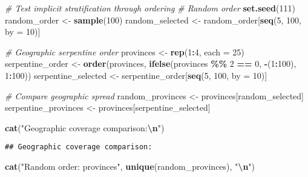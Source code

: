 \documentclass[
]{article}
\newenvironment{Shaded}{\begin{snugshade}}{\end{snugshade}}
\newcommand{\AttributeTok}[1]{\textcolor[rgb]{0.13,0.29,0.53}{#1}}
\newcommand{\CommentTok}[1]{\textcolor[rgb]{0.56,0.35,0.01}{\textit{#1}}}
\newcommand{\DecValTok}[1]{\textcolor[rgb]{0.00,0.00,0.81}{#1}}
\newcommand{\FunctionTok}[1]{\textcolor[rgb]{0.13,0.29,0.53}{\textbf{#1}}}
\newcommand{\NormalTok}[1]{#1}
\newcommand{\OtherTok}[1]{\textcolor[rgb]{0.56,0.35,0.01}{#1}}
\newcommand{\SpecialCharTok}[1]{\textcolor[rgb]{0.81,0.36,0.00}{\textbf{#1}}}
\newcommand{\StringTok}[1]{\textcolor[rgb]{0.31,0.60,0.02}{#1}}
\begin{document}
\begin{Shaded}
\begin{Highlighting}[]
\CommentTok{\# Test implicit stratification through ordering}
\CommentTok{\# Random order}
\FunctionTok{set.seed}\NormalTok{(}\DecValTok{111}\NormalTok{)}
\NormalTok{random\_order }\OtherTok{\textless{}{-}} \FunctionTok{sample}\NormalTok{(}\DecValTok{100}\NormalTok{)}
\NormalTok{random\_selected }\OtherTok{\textless{}{-}}\NormalTok{ random\_order[}\FunctionTok{seq}\NormalTok{(}\DecValTok{5}\NormalTok{, }\DecValTok{100}\NormalTok{, }\AttributeTok{by =} \DecValTok{10}\NormalTok{)]}

\CommentTok{\# Geographic serpentine order}
\NormalTok{provinces }\OtherTok{\textless{}{-}} \FunctionTok{rep}\NormalTok{(}\DecValTok{1}\SpecialCharTok{:}\DecValTok{4}\NormalTok{, }\AttributeTok{each =} \DecValTok{25}\NormalTok{)}
\NormalTok{serpentine\_order }\OtherTok{\textless{}{-}} \FunctionTok{order}\NormalTok{(provinces, }
                         \FunctionTok{ifelse}\NormalTok{(provinces }\SpecialCharTok{\%\%} \DecValTok{2} \SpecialCharTok{==} \DecValTok{0}\NormalTok{, }\SpecialCharTok{{-}}\NormalTok{(}\DecValTok{1}\SpecialCharTok{:}\DecValTok{100}\NormalTok{), }\DecValTok{1}\SpecialCharTok{:}\DecValTok{100}\NormalTok{))}
\NormalTok{serpentine\_selected }\OtherTok{\textless{}{-}}\NormalTok{ serpentine\_order[}\FunctionTok{seq}\NormalTok{(}\DecValTok{5}\NormalTok{, }\DecValTok{100}\NormalTok{, }\AttributeTok{by =} \DecValTok{10}\NormalTok{)]}

\CommentTok{\# Compare geographic spread}
\NormalTok{random\_provinces }\OtherTok{\textless{}{-}}\NormalTok{ provinces[random\_selected]}
\NormalTok{serpentine\_provinces }\OtherTok{\textless{}{-}}\NormalTok{ provinces[serpentine\_selected]}

\FunctionTok{cat}\NormalTok{(}\StringTok{"Geographic coverage comparison:}\SpecialCharTok{\textbackslash{}n}\StringTok{"}\NormalTok{)}
\end{Highlighting}
\end{Shaded}

\begin{verbatim}
## Geographic coverage comparison:
\end{verbatim}

\begin{Shaded}
\begin{Highlighting}[]
\FunctionTok{cat}\NormalTok{(}\StringTok{"Random order: provinces"}\NormalTok{, }\FunctionTok{unique}\NormalTok{(random\_provinces), }\StringTok{"}\SpecialCharTok{\textbackslash{}n}\StringTok{"}\NormalTok{)}
\end{Highlighting}
\end{Shaded}
\end{document}
